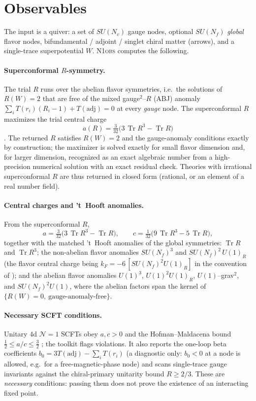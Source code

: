 \documentclass[11.5pt]{scrartcl}
\newcommand{\N}{\mathcal{N}}
\newcommand{\tr}{\operatorname{Tr}}
\newcommand{\Nf}{N_f}
\newcommand{\toolname}{\textsc{N1obs}}
\begin{document}
\section{Observables}

The input is a quiver: a set of $SU(N_v)$ gauge nodes, optional $SU(\Nf)$
\emph{global} flavor nodes, bifundamental / adjoint / singlet chiral matter
(arrows), and a single-trace superpotential $W$. \toolname{} computes the
following.

\paragraph{Superconformal $R$-symmetry.}
The trial $R$ runs over the abelian flavor symmetries, i.e.\ the solutions of
$R(W)=2$ that are free of the mixed gauge$^2$--$R$ (ABJ) anomaly
$\sum_i T(r_i)(R_i-1)+T(\mathrm{adj})=0$ at every \emph{gauge} node. The
superconformal $R$ maximizes the trial central charge
\begin{equation}
  a(R)=\tfrac{3}{32}\bigl(3\,\tr R^3-\tr R\bigr)
\end{equation}
\cite{hep-th/0304128}. The returned $R$ satisfies $R(W)=2$ and the
gauge-anomaly conditions exactly by construction; the maximizer is solved
exactly for small flavor dimension and, for larger dimension, recognized as an
exact algebraic number from a high-precision numerical solution with an exact
residual check. Theories with irrational superconformal $R$ are thus returned
in closed form (rational, or an element of a real number field).

\paragraph{Central charges and 't~Hooft anomalies.}
From the superconformal $R$,
\begin{equation}
  a=\tfrac{3}{32}\bigl(3\,\tr R^3-\tr R\bigr),\qquad
  c=\tfrac{1}{32}\bigl(9\,\tr R^3-5\,\tr R\bigr),
\end{equation}
together with the matched 't~Hooft anomalies of the global symmetries: $\tr R$
and $\tr R^3$; the non-abelian flavor anomalies $SU(\Nf)^3$ and
$SU(\Nf)^2\,U(1)_R$ (the flavor central charge being
$k_F=-6\,[SU(\Nf)^2 U(1)_R]$ in the convention of \cite{hep-th/9708042}); and
the abelian flavor anomalies $U(1)^3$, $U(1)^2 U(1)_R$, $U(1)$--grav$^2$, and
$SU(\Nf)^2 U(1)$, where the abelian factors span the kernel of
$\{R(W)=0,\ \text{gauge-anomaly-free}\}$.

\paragraph{Necessary SCFT conditions.}
Unitary 4d $\N=1$ SCFTs obey $a,c>0$ and the Hofman--Maldacena bound
$\tfrac12\le a/c\le\tfrac32$ \cite{0803.1467}; the toolkit flags violations. It
also reports the one-loop beta coefficients
$b_0=3T(\mathrm{adj})-\sum_i T(r_i)$ (a diagnostic only: $b_0<0$ at a node is
allowed, e.g.\ for a free-magnetic-phase node) and scans single-trace gauge
invariants against the chiral-primary unitarity bound $R\ge 2/3$. These are
\emph{necessary} conditions: passing them does not prove the existence of an
interacting fixed point.
\end{document}
